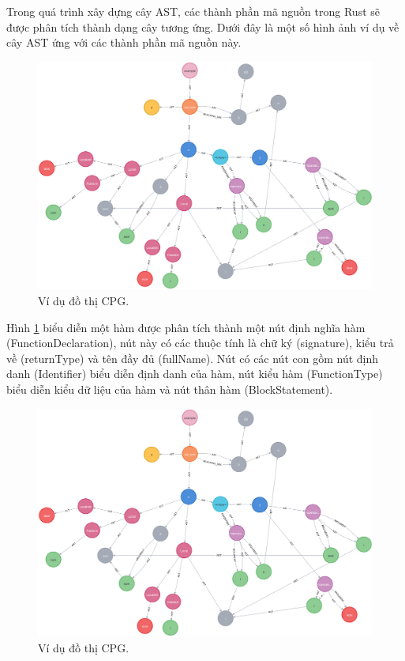 

Trong quá trình xây dựng cây AST, các thành phần mã nguồn trong Rust sẽ được phân tích thành dạng cây tương ứng.
Dưới đây là một số hình ảnh ví dụ về cây AST ứng với các thành phần mã nguồn này.

\begin{figure}[H]
  \includegraphics[width=1\columnwidth]{figures/c2/c2_cpg.png}
  \centering
  \caption{Ví dụ đồ thị CPG.}
  \label{img:c3_temp1}
\end{figure}

Hình \ref{img:c3_temp1} biểu diễn một hàm được phân tích thành một nút định nghĩa hàm (FunctionDeclaration), nút này có các thuộc tính là chữ ký (signature), kiểu trả về (returnType) và tên đầy đủ (fullName).
Nút có các nút con gồm nút định danh (Identifier) biểu diễn định danh của hàm, nút kiểu hàm (FunctionType) biểu diễn kiểu dữ liệu của hàm và nút thân hàm (BlockStatement).

\begin{figure}[H]
  \includegraphics[width=1\columnwidth]{figures/c2/c2_cpg.png}
  \centering
  \caption{Ví dụ đồ thị CPG.}
  \label{img:c3_temp2}
\end{figure}

